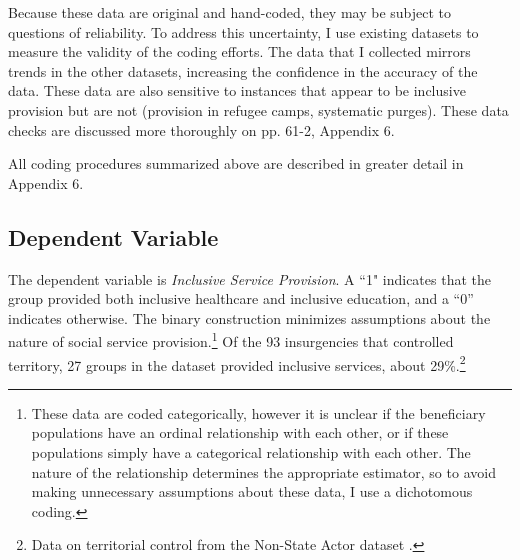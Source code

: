 \documentclass[12pt, letterpaper]{article}
\begin{document}
Because these data are original and hand-coded, they may be subject to questions of reliability. To address this uncertainty, I use existing datasets \citep{florea2014facto,kalyvas2010international} to measure the validity of the coding efforts. The data that I collected mirrors trends in the other datasets, increasing the confidence in the accuracy of the data. These data are also sensitive to instances that appear to be inclusive provision but are not (provision in refugee camps, systematic purges). These data checks are discussed more thoroughly on pp. 61-2, Appendix 6.

All coding procedures summarized above are described in greater detail in Appendix 6. 




\subsection*{Dependent Variable}

The dependent variable is \textit{Inclusive Service Provision}.  A ``1" indicates that the group provided both inclusive healthcare and inclusive education, and a ``0'' indicates otherwise. The binary construction minimizes assumptions about the nature of social service provision.\footnote{These data are coded categorically, however it is unclear if the beneficiary populations have an ordinal relationship with each other, or if these populations simply have a categorical relationship with each other. The nature of the relationship determines the appropriate estimator, so to avoid making unnecessary assumptions about these data, I use a dichotomous coding.} Of the 93 insurgencies that controlled territory, 27 groups in the dataset provided inclusive services, about 29\%.\footnote{Data on territorial control from the Non-State Actor dataset \citep{cunningham2009takes}.}%
\end{document}
